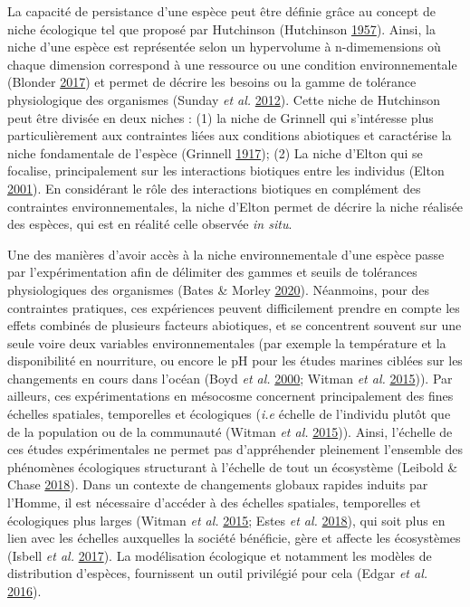 \documentclass[12pt,]{article}
\begin{document}
La capacité de persistance d'une espèce peut être définie grâce au
concept de niche écologique tel que proposé par Hutchinson (Hutchinson
\protect\hyperlink{ref-Hutchinson_1957}{1957}). Ainsi, la niche d'une
espèce est représentée selon un hypervolume à n-dimemensions où chaque
dimension correspond à une ressource ou une condition environnementale
(Blonder \protect\hyperlink{ref-Blonder_2017}{2017}) et permet de
décrire les besoins ou la gamme de tolérance physiologique des
organismes (Sunday \emph{et al.}
\protect\hyperlink{ref-Sunday_2012}{2012}). Cette niche de Hutchinson
peut être divisée en deux niches : (1) la niche de Grinnell qui
s'intéresse plus particulièrement aux contraintes liées aux conditions
abiotiques et caractérise la niche fondamentale de l'espèce (Grinnell
\protect\hyperlink{ref-Grinnell_1917}{1917}); (2) La niche d'Elton qui
se focalise, principalement sur les interactions biotiques entre les
individus (Elton \protect\hyperlink{ref-Elton_2001}{2001}). En
considérant le rôle des interactions biotiques en complément des
contraintes environnementales, la niche d'Elton permet de décrire la
niche réalisée des espèces, qui est en réalité celle observée \emph{in
situ}.

Une des manières d'avoir accès à la niche environnementale d'une espèce
passe par l'expérimentation afin de délimiter des gammes et seuils de
tolérances physiologiques des organismes (Bates \& Morley
\protect\hyperlink{ref-Bates_2020}{2020}). Néanmoins, pour des
contraintes pratiques, ces expériences peuvent difficilement prendre en
compte les effets combinés de plusieurs facteurs abiotiques, et se
concentrent souvent sur une seule voire deux variables environnementales
(par exemple la température et la disponibilité en nourriture, ou encore
le pH pour les études marines ciblées sur les changements en cours dans
l'océan (Boyd \emph{et al.} \protect\hyperlink{ref-Boyd_2000}{2000};
Witman \emph{et al.} \protect\hyperlink{ref-Witman_2015}{2015})). Par
ailleurs, ces expérimentations en mésocosme concernent principalement
des fines échelles spatiales, temporelles et écologiques (\emph{i.e}
échelle de l'individu plutôt que de la population ou de la communauté
(Witman \emph{et al.} \protect\hyperlink{ref-Witman_2015}{2015})).
Ainsi, l'échelle de ces études expérimentales ne permet pas
d'appréhender pleinement l'ensemble des phénomènes écologiques
structurant à l'échelle de tout un écosystème (Leibold \& Chase
\protect\hyperlink{ref-Leibold_2018}{2018}). Dans un contexte de
changements globaux rapides induits par l'Homme, il est nécessaire
d'accéder à des échelles spatiales, temporelles et écologiques plus
larges (Witman \emph{et al.} \protect\hyperlink{ref-Witman_2015}{2015};
Estes \emph{et al.} \protect\hyperlink{ref-Estes_2018}{2018}), qui soit
plus en lien avec les échelles auxquelles la société bénéficie, gère et
affecte les écosystèmes (Isbell \emph{et al.}
\protect\hyperlink{ref-Isbell_2017}{2017}). La modélisation écologique
et notamment les modèles de distribution d'espèces, fournissent un outil
privilégié pour cela (Edgar \emph{et al.}
\protect\hyperlink{ref-Edgar_2016}{2016}).
\end{document}
